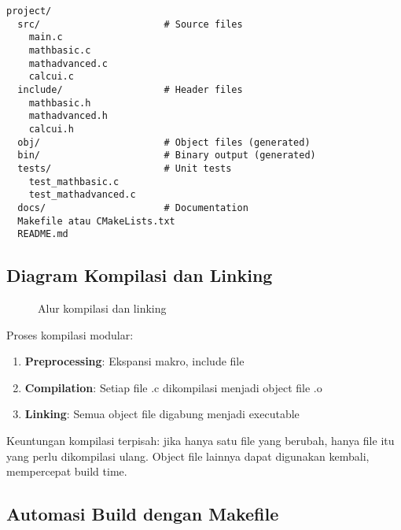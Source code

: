 \documentclass[../main.tex]{subfiles}
\begin{document}
\begin{lstlisting}[caption={Struktur direktori proyek modular}]
project/
  src/                      # Source files
    main.c
    mathbasic.c
    mathadvanced.c
    calcui.c
  include/                  # Header files
    mathbasic.h
    mathadvanced.h
    calcui.h
  obj/                      # Object files (generated)
  bin/                      # Binary output (generated)
  tests/                    # Unit tests
    test_mathbasic.c
    test_mathadvanced.c
  docs/                     # Documentation
  Makefile atau CMakeLists.txt
  README.md
\end{lstlisting}

\subsection{Diagram Kompilasi dan Linking}
\begin{figure}[H]
  \centering
  \caption{Alur kompilasi dan linking}
\end{figure}

Proses kompilasi modular:
\begin{enumerate}
  \item \textbf{Preprocessing}: Ekspansi makro, include file
  \item \textbf{Compilation}: Setiap file .c dikompilasi menjadi object file .o
  \item \textbf{Linking}: Semua object file digabung menjadi executable
\end{enumerate}

Keuntungan kompilasi terpisah: jika hanya satu file yang berubah, hanya file itu yang perlu dikompilasi ulang. Object file lainnya dapat digunakan kembali, mempercepat build time.

\subsection{Automasi Build dengan Makefile}
\end{document}
